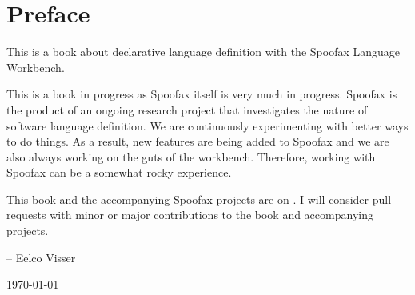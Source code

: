 \chapter*{Preface}

This is a book about declarative language definition with the Spoofax Language
Workbench.

This is a book in progress as Spoofax itself is very much in progress.
Spoofax is the product of an ongoing research project that investigates the
nature of software language definition.
We are continuously experimenting with better ways to do things. 
As a result, new features are being added to Spoofax and we are also always
working on the guts of the workbench.
Therefore, working with Spoofax can be a somewhat rocky experience.

This book and the accompanying Spoofax projects are on . 
I will consider pull requests with minor or major contributions to the book
and accompanying projects.

-- Eelco Visser

\today

